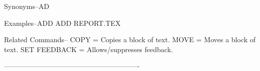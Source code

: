 Synonyms--AD
 
Examples--ADD
          ADD REPORT.TEX
 
Related Commands--
          COPY            = Copies a block of text.
          MOVE            = Moves a block of text.
          SET FEEDBACK    = Allows/suppresses feedback.
 
----------------------------------------------------------
 
 
 
 
 
 
 
 
 
 
 
 
 
 
 
 
 
 
 
 
 
 
 
 
 
 
 
 
 
 
 
 
 
 
 
 
 
 
 
 
 
 
 
 
 
 
 
 
 
 
 
 
 
 
 
 
 
 
 
 
 
 
 
 
 
 
 
 
 
 
 
 
 
 
 
 
 
 
 
 
 
 
 
 
 
 
 
 
 
 
 
 
 
 
 
 
 
 
 
